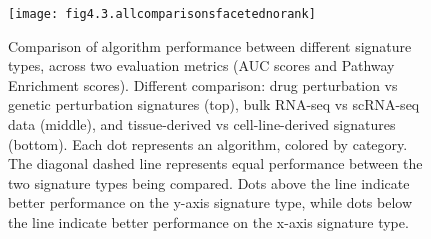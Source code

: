 \begin{figure}[htbp]
    \centering
    \texttt{[image: fig4.3.allcomparisonsfacetednorank]}
    \caption[Comparison of algorithm performance between different signature types.]{Comparison of algorithm performance between different signature types, across two evaluation metrics (\gls{AUC} scores and Pathway Enrichment scores). Different comparison: drug perturbation vs genetic perturbation signatures (top), bulk \gls{RNA-seq} vs \gls{scRNA-seq} data (middle), and tissue-derived vs cell-line-derived signatures (bottom). Each dot represents an algorithm, colored by category. The diagonal dashed line represents equal performance between the two signature types being compared. Dots above the line indicate better performance on the y-axis signature type, while dots below the line indicate better performance on the x-axis signature type.}
    \label{fig:fig4.3.allcomparisonsfacetednorank}
\end{figure}


